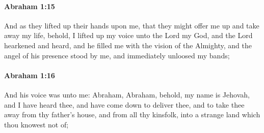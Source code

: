 		\paragraph{Abraham 1:15} %
			\label{ABRAHAM-1-15}

			And as they lifted up their hands upon me, that they might offer me up and take away my life, behold, I lifted up my voice unto the Lord my God, and the Lord hearkened and heard, and he filled me with the vision of the Almighty, and the angel of his presence stood by me, and immediately unloosed my bands;


		\paragraph{Abraham 1:16} %
			\label{ABRAHAM-1-16}

			And his voice was unto me: Abraham, Abraham, behold, my name is Jehovah, and I have heard thee, and have come down to deliver thee, and to take thee away from thy father's house, and from all thy kinsfolk, into a strange land which thou knowest not of;


